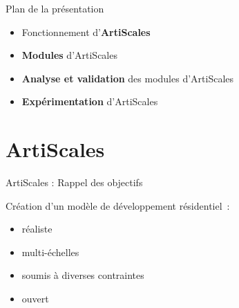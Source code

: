 \documentclass[xcolor=table]{beamer}
\begin{document}




\begin{frame}{Plan de la présentation}
	\begin{itemize}
		\item Fonctionnement d'\textbf{ArtiScales}
		\item \textbf{Modules} d'ArtiScales
		\item \textbf{Analyse et validation} des modules d'ArtiScales
		\item \textbf{Expérimentation} d'ArtiScales
	\end{itemize}
\end{frame}




\section{ArtiScales}

\begin{frame}{ArtiScales : Rappel des objectifs}
		\begin{block}{}
		Création d'un modèle de développement résidentiel~:
		\begin{itemize}
			\footnotesize
			\item réaliste %
			\item multi-échelles %
			\item soumis à diverses contraintes %
			\item ouvert %
		\end{itemize}
	\end{block}
\end{frame}
\end{document}
